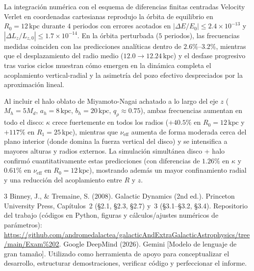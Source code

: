 \documentclass[11pt,letterpaper]{article}
\begin{document}
La integración numérica con el esquema de diferencias finitas centradas Velocity Verlet en coordenadas cartesianas reprodujo la órbita de equilibrio en $R_0 = 12\,\mathrm{kpc}$ durante $4$ periodos con errores acotados en $|\Delta E/E_0| \le 2.4\times 10^{-13}$ y $|\Delta L_z/L_{z,0}| \le 1.7\times 10^{-14}$. En la órbita perturbada ($5$ periodos), las frecuencias medidas coinciden con las predicciones analíticas dentro de $2.6\%$--$3.2\%$, mientras que el desplazamiento del radio medio ($12.0 \to 12.24\,\mathrm{kpc}$) y el desfase progresivo tras varios ciclos muestran cómo emergen en la dinámica completa el acoplamiento vertical-radial y la asimetría del pozo efectivo despreciados por la aproximación lineal.

Al incluir el halo oblato de Miyamoto-Nagai achatado a lo largo del eje $z$ ($M_h = 5M_d$, $a_h = 8\,\mathrm{kpc}$, $b_h = 20\,\mathrm{kpc}$, $q_\rho \approx 0.75$), ambas frecuencias aumentan en todo el disco: $\kappa$ crece fuertemente en todos los radios ($+40.5\%$ en $R_0 = 12\,\mathrm{kpc}$ y $+117\%$ en $R_1 = 25\,\mathrm{kpc}$), mientras que $\nu_{\mathrm{eff}}$ aumenta de forma moderada cerca del plano interior (donde domina la fuerza vertical del disco) y se intensifica a mayores alturas y radios externos. La simulación simultánea disco + halo confirmó cuantitativamente estas predicciones (con diferencias de $1.26\%$ en $\kappa$ y $0.61\%$ en $\nu_{\mathrm{eff}}$ en $R_0 = 12\,\mathrm{kpc}$), mostrando además un mayor confinamiento radial y una reducción del acoplamiento entre $R$ y $z$.

\begin{thebibliography}{3}
     Binney, J., \& Tremaine, S. (2008). Galactic Dynamics (2nd ed.). Princeton University Press, Capítulos~2 (\S 2.1, \S 2.3, \S 2.7) y~3 (\S 3.1--\S 3.2, \S 3.4).
     Repositorio del trabajo (códigos en Python, figuras y cálculos/ajustes numéricos de parámetros): {\footnotesize\url{https://github.com/andromedalactea/galacticAndExtraGalacticAstrophysics/tree/main/Exam%202}}.
     Google DeepMind (2026). Gemini [Modelo de lenguaje de gran tamaño]. Utilizado como herramienta de apoyo para conceptualizar el desarrollo, estructurar demostraciones, verificar código y perfeccionar el informe.
\end{thebibliography}
\end{document}
